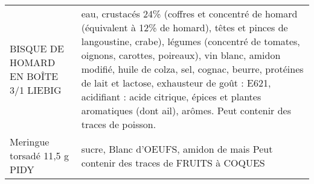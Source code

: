 \begin{longtable}{p{5cm}p{10cm}}
                                                                     BISQUE DE HOMARD EN BOÎTE 3/1 LIEBIG &                                                                                                                                                                                                                                                                                                                                                                                                                                                                                                                                                                                                       eau, crustacés 24\% (coffres et concentré de homard (équivalent à 12\% de homard), têtes et pinces de langoustine, crabe), légumes (concentré de tomates, oignons, carottes, poireaux), vin blanc, amidon modifié, huile de colza, sel, cognac, beurre, protéines de lait et lactose, exhausteur de goût : E621, acidifiant : acide citrique, épices et plantes aromatiques (dont ail), arômes. Peut contenir des traces de poisson. \\
                                                                             Meringue torsadé 11,5 g PIDY &                                                                                                                                                                                                                                                                                                                                                                                                                                                                                                                                                                                                                                                                                                                                                                                                                                                                                                                                                        sucre, Blanc d'OEUFS, amidon de mais  Peut contenir des traces de FRUITS à COQUES \\

\end{longtable}
